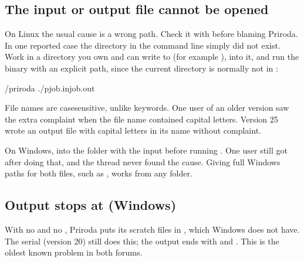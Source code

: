 \documentclass[letterpaper,10pt,english,openany,oneside]{sphinxmanual}
\begin{document}
\subsection{The input or output file cannot be opened}
\label{\detokenize{troubleshooting/common-problems:the-input-or-output-file-cannot-be-opened}}
\sphinxAtStartPar
On Linux the usual cause is a wrong path. Check it with  before blaming Priroda. In one reported case the
directory in the command line simply did not exist. Work in a directory you own and can write to (for example
),  into it, and run the binary with an explicit path, since the current directory is normally not in
:



\begin{sphinxVerbatim}[commandchars=\\\{\}]
\PYGZti{}/priroda
./pjob.injob.out
\end{sphinxVerbatim}

\sphinxAtStartPar
File names are case\sphinxhyphen{}sensitive, unlike keywords. One user of an older version saw the extra complaint
 when the file name contained capital letters. Version 25 wrote an output file with
capital letters in its name without complaint.



\sphinxAtStartPar
On Windows,  into the folder with the input before running . One user still got
 after doing that, and the thread never found the cause. Giving full Windows paths for both
files, such as , works from any folder.




\subsection{Output stops at  (Windows)}
\label{\detokenize{troubleshooting/common-problems:output-stops-at-0-opening-file-tmp-windows}}
\sphinxAtStartPar
{} With no  and no , Priroda puts its scratch files in , which Windows does not have.
The serial  (version 20) still does this; the output ends with  and
. This is the oldest known problem in both forums.
\end{document}
